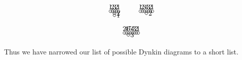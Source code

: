  \[\begin{xy}
   (0,0) *+!D{1} *\cir<2pt>{};
   (1,0) *+!D{2} *\cir<2pt>{} **@{-};
   p+(1,0) *+!D{3} *\cir<2pt>{} **@{-};
       {p+(0,-1) *+!L{2} *\cir<2pt>{} **@{-};
       p+(0,-1) *+!L{1} *\cir<2pt>{} **@{-};},
   p+(1,0) *+!D{2} *\cir<2pt>{} **@{-};
   p+(1,0) *+!D{1} *\cir<2pt>{} **@{-};
 \end{xy}\qquad
 \begin{xy}
   (0,0) *+!D{1} *\cir<2pt>{};
   (1,0) *+!D{2} *\cir<2pt>{} **@{-};
   p+(1,0) *+!D{3} *\cir<2pt>{} **@{-};
   p+(1,0) *+!D{4} *\cir<2pt>{} **@{-};
        p+(0,-1) *+!L{2} *\cir<2pt>{} **@{-},
   p+(1,0) *+!D{3} *\cir<2pt>{} **@{-};
   p+(1,0) *+!D{2} *\cir<2pt>{} **@{-};
   p+(1,0) *+!D{1} *\cir<2pt>{} **@{-};
 \end{xy}\]
 \[\begin{xy}
   (0,0) *+!D{2} *\cir<2pt>{};
   (1,0) *+!D{4} *\cir<2pt>{} **@{-};
   p+(1,0) *+!D{6} *\cir<2pt>{} **@{-};
       p+(0,-1) *+!L{3} *\cir<2pt>{} **@{-},
   p+(1,0) *+!D{5} *\cir<2pt>{} **@{-};
   p+(1,0) *+!D{4} *\cir<2pt>{} **@{-};
   p+(1,0) *+!D{3} *\cir<2pt>{} **@{-};
   p+(1,0) *+!D{2} *\cir<2pt>{} **@{-};
   p+(1,0) *+!D{1} *\cir<2pt>{} **@{-};
 \end{xy}\]

 Thus we have narrowed our list of possible Dynkin diagrams to a short list.


